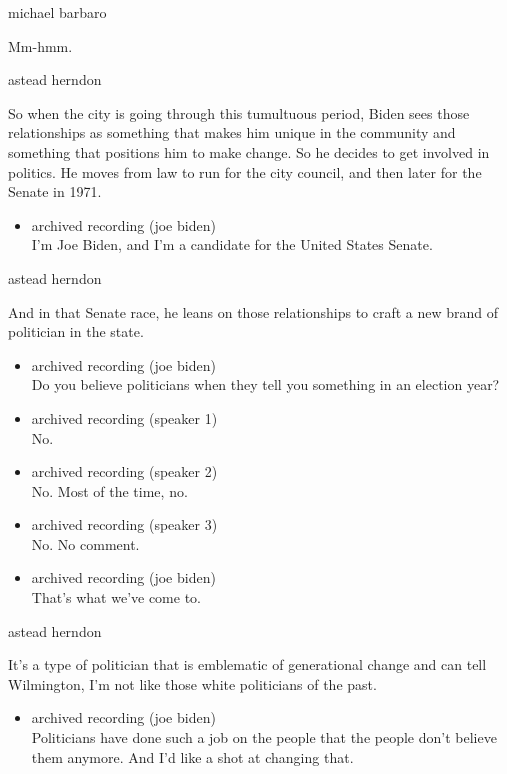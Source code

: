michael barbaro

Mm-hmm.

astead herndon

So when the city is going through this tumultuous period, Biden sees
those relationships as something that makes him unique in the community
and something that positions him to make change. So he decides to get
involved in politics. He moves from law to run for the city council, and
then later for the Senate in 1971.

\begin{itemize}
\tightlist
\item
  archived recording (joe biden)\\
  I'm Joe Biden, and I'm a candidate for the United States Senate.
\end{itemize}

astead herndon

And in that Senate race, he leans on those relationships to craft a new
brand of politician in the state.

\begin{itemize}
\item
  archived recording (joe biden)\\
  Do you believe politicians when they tell you something in an election
  year?
\item
  archived recording (speaker 1)\\
  No.
\item
  archived recording (speaker 2)\\
  No. Most of the time, no.
\item
  archived recording (speaker 3)\\
  No. No comment.
\item
  archived recording (joe biden)\\
  That's what we've come to.
\end{itemize}

astead herndon

It's a type of politician that is emblematic of generational change and
can tell Wilmington, I'm not like those white politicians of the past.

\begin{itemize}
\tightlist
\item
  archived recording (joe biden)\\
  Politicians have done such a job on the people that the people don't
  believe them anymore. And I'd like a shot at changing that.
\end{itemize}

